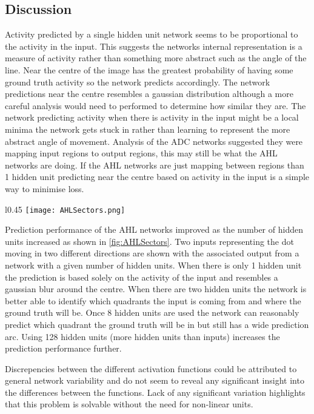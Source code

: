 \subsection{Discussion}
Activity predicted by a single hidden unit network seems to be proportional to the activity in the input.
This suggests the networks internal representation is a measure of activity rather than something more abstract such as the angle of the line.
Near the centre of the image has the greatest probability of having some ground truth activity so the network predicts accordingly.
The network predictions near the centre resembles a gaussian distribution although a more careful analysis would need to performed to determine how similar they are. 
The network predicting activity when there is activity in the input might be a local minima the network gets stuck in rather than learning to represent the more abstract angle of movement. 
Analysis of the ADC networks suggested they were mapping input regions to output regions, this may still be what the AHL networks are doing. 
If the AHL networks are just mapping between regions than 1 hidden unit predicting near the centre based on activity in the input is a simple way to minimise loss. 

\begin{wrapfigure}[27]{l}{0.45\textwidth}
    \centering
    \texttt{[image: AHLSectors.png]}
    \caption{Two AHL inputs/prediction pairs for different numbers of hidden units.}
    \label{fig:AHLSectors}
\end{wrapfigure}

Prediction performance of the AHL networks improved as the number of hidden units increased as shown in \ref{fig:AHLSectors}.
Two inputs representing the dot moving in two different directions are shown with the associated output from a network with a given number of hidden units.  
When there is only 1 hidden unit the prediction is based solely on the activity of the input and resembles a gaussian blur around the centre.
When there are two hidden units the network is better able to identify which quadrants the input is coming from and where the ground truth will be.
Once 8 hidden units are used the network can reasonably predict which quadrant the ground truth will be in but still has a wide prediction arc.
Using 128 hidden units (more hidden units than inputs) increases the prediction performance further. 

Discrepencies between the different activation functions could be attributed to general network variability and do not seem to reveal any significant insight into the differences between the functions.
Lack of any significant variation highlights that this problem is solvable without the need for non-linear units. 

